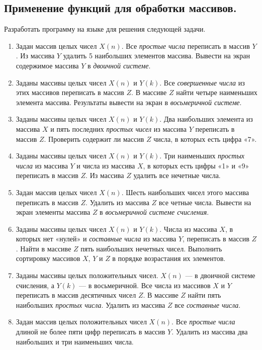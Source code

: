 \subsection[Применение функций для обработки массивов.]{Применение функций для обработки массивов.}
Разработать программу на языке  для решения следующей задачи.

\begin{enumerate}
\item Задан массив целых чисел $X(n)$. Все \emph{простые числа} переписать в массив
$Y$. Из массива $Y$ удалить 5 наибольших элементов массива. Вывести на экран содержимое массива
$Y$ в \emph{двоичной системе}.
\item Заданы массивы целых чисел $X(n)$ и $Y(k)$. Все
\emph{совершенные числа} из этих массивов переписать в массив $Z$. В массиве
$Z$ найти четыре наименьших элемента массива. 
Результаты вывести на экран в \emph{восьмеричной системе}. 
\item Заданы массивы целых чисел $X(n)$ и $Y(k)$. Два наибольших
элемента из массива $X$ и пять последних \emph{простых чисел} из массива
$Y$ переписать в массив $Z$. Проверить содержит ли массив $Z$ числа, в
которых есть цифра «7».
\item Заданы массивы целых чисел $X(n)$ и $Y(k)$. Три наименьших
\emph{простых числа} из массива $Y$ и числа из массива $X$, в которых есть цифры «1»
и «9» переписать в массив $Z$. Из  массива $Z$ удалить все нечетные числа.
\item Задан массив целых чисел $X(n)$. Шесть наибольших чисел этого массива переписать в массив
$Z$. Удалить из массива $Z$ все четные числа. Вывести на экран элементы массива
$Z$ в \emph{восьмеричной системе счисления}.
\item Заданы массивы целых чисел $X(n)$ и $Y(k)$. Числа из массива
$X$, в которых нет «нулей» и \emph{составные числа} из массива $Y$, переписать в массив
$Z$. Найти в массиве $Z$ пять наибольших нечетных чисел. Выполнить сортировку массивов $X$,
$Y$ и $Z$ в порядке возрастания их элементов.
\item Заданы массивы целых положительных чисел. $X(n)$ --- в двоичной системе счисления, а 
$Y(k)$ --- в восьмеричной. Все числа из массивов $X$ и $Y$
переписать в массив десятичных чисел $Z$. В массиве $Z$ найти пять наибольших
\emph{простых числа}. Удалить из массива $Z$ все \emph{составные числа}.
\item Задан массив целых положительных чисел $X(n)$. Все \emph{простые числа} длиной не более
пяти цифр переписать в массив $Y$. Удалить из массива два наибольших и три наименьших числа.

\end{enumerate}

